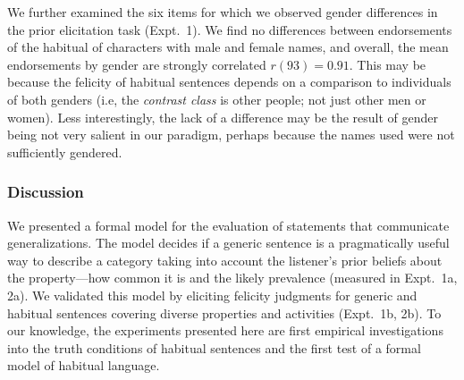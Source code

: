 \documentclass[11pt,letterpaper]{article}
\begin{document}
We further examined the six items for which we observed gender differences in the prior elicitation task (Expt.~1).
We find no differences between endorsements of the habitual of characters with male and female names, and overall, the mean endorsements by gender are strongly correlated $r(93) = 0.91$. 
This may be because the felicity of habitual sentences depends on a comparison to individuals of both genders (i.e, the \emph{contrast class} is other people; not just other men or women). 
Less interestingly, the lack of a difference may be the result of gender being not very salient in our paradigm, perhaps because the names used were not sufficiently gendered.

\subsubsection*{Discussion}

We presented a formal model for the evaluation of statements that communicate generalizations.
The model decides if a generic sentence is a pragmatically useful way to describe a category taking into account the listener's prior beliefs about the property---how common it is and the likely prevalence (measured in Expt.~1a, 2a).
We validated this model by eliciting felicity judgments for generic and habitual sentences covering diverse properties and activities (Expt.~1b, 2b).
To our knowledge, the experiments presented here are first empirical investigations into the truth conditions of habitual sentences and the first test of a formal model of habitual language.







\setlength{\bibleftmargin}{.125in}
\setlength{\bibindent}{-\bibleftmargin}


\end{document}
